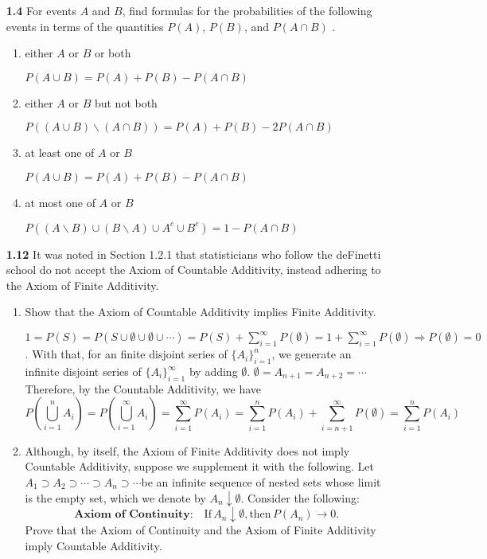 \documentclass[letter]{article}
\begin{document}
\begin{itemize}[leftmargin = 0 em]
\begin{itemize}[leftmargin = 0em]
	\end{itemize}
	
	\item [\bf 1.4] For events $A$ and $B$, find formulas for the probabilities of the following events in terms of the quantities $P(A)$, $P(B)$, and $P(A \cap B)$ .
	\begin{enumerate}[label = (\alph*), leftmargin = 0em]
		\item either $A$ or $B$ or both
		
		$P(A\cup B) = P(A) + P(B) -P(A\cap B)$
		\item either $A$ or $B$ but not both
		
		$P((A\cup B)\backslash (A\cap B)) = P(A) + P(B) - 2P(A\cap B)$
		\item at least one of $A$ or $B$

		$P(A\cup B) = P(A) + P(B) - P(A\cap B)$
		\item at most one of $A$ or $B$
		
		$P((A\backslash B)\cup(B\backslash A) \cup A^c \cup B^c )= 1 - P(A\cap B) $
	\end{enumerate}
	

	\item [\bf 1.12] It was noted in Section 1.2.1 that statisticians who follow the deFinetti school do not accept the Axiom of Countable Additivity, instead adhering to the Axiom of Finite Additivity.
	\begin{enumerate}[label = (\alph*), leftmargin = 0em]
		\item Show that the Axiom of Countable Additivity implies Finite Additivity.


		$1 = P(S) = P(S\cup \emptyset \cup \emptyset \cup \cdots ) = P(S) + \sum_{i =1}^{\infty}P (\emptyset) = 1 + \sum_{i =1 }^{\infty}  P(\emptyset) \Rightarrow  P(\emptyset) = 0$. With that, for an finite disjoint series of $\{A_i\}_{i=1}^n$, we generate an infinite disjoint series of $\{A_i\}_{i=1}^\infty$ by adding $\emptyset$. $\emptyset = A_{n+1} = A_{n+2} = \cdots$ Therefore, by the Countable Additivity, we have 
		\[P(\bigcup_{i=1}^n A_i) = P(\bigcup_{i=1}^\infty A_i) = \sum_{i=1}^\infty P(A_i) = \sum_{i=1}^{n} P(A_i) + \sum_{i=n+1}^{\infty}P(\emptyset) = \sum_{i=1}^n P(A_i)\]
		\item Although, by itself, the Axiom of Finite Additivity does not imply Countable
Additivity, suppose we supplement it with the following. Let $A_1 \supset A_2 \supset \cdots \supset A_n \supset \cdots $be an infinite sequence of nested sets whose limit is the empty set, which we denote by $A_n \downarrow \emptyset$. Consider the following:
\[\textbf{Axiom of Continuity:} \quad \textrm{If} \, A_n \downarrow \emptyset, \textrm{then} \, P(A_n) \rightarrow 0.\]
Prove that the Axiom of Continuity and the Axiom of Finite Additivity imply
Countable Additivity.


\end{enumerate}
\end{itemize}
\end{document}
